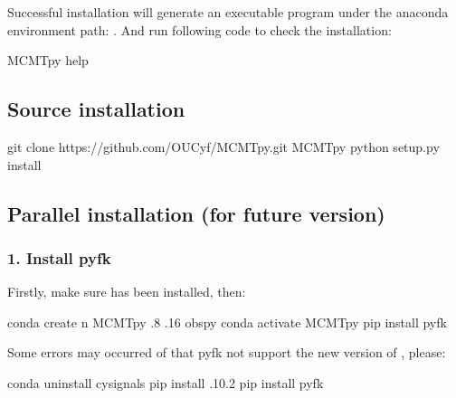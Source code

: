 \documentclass[a4paper,10pt,english,openany]{sphinxmanual}
\begin{document}
Successful installation will generate an executable program  under the anaconda environment path:
. And run following code to check the installation:

\begin{sphinxVerbatim}[commandchars=\\\{\}]
\PYGZdl{} MCMTpy \PYGZhy{}\PYGZhy{}help
\end{sphinxVerbatim}


\subsection{Source installation}
\label{\detokenize{installation:source-installation}}
\begin{sphinxVerbatim}[commandchars=\\\{\}]
\PYGZdl{} git clone https://github.com/OUCyf/MCMTpy.git
\PYGZdl{}  MCMTpy
\PYGZdl{} python setup.py install
\end{sphinxVerbatim}


\subsection{Parallel installation (for future version)}
\label{\detokenize{installation:parallel-installation-for-future-version}}

\subsubsection{1. Install pyfk}
\label{\detokenize{installation:install-pyfk}}
Firstly, make sure  has been installed, then:

\begin{sphinxVerbatim}[commandchars=\\\{\}]
\PYGZdl{} conda create \PYGZhy{}n MCMTpy  .8 .16 obspy
\PYGZdl{} conda activate MCMTpy
\PYGZdl{} pip install pyfk
\end{sphinxVerbatim}

Some errors may occurred of that pyfk not support the new version of , please:

\begin{sphinxVerbatim}[commandchars=\\\{\}]
\PYGZdl{} conda uninstall cysignals
\PYGZdl{} pip install .10.2
\PYGZdl{} pip install pyfk
\end{sphinxVerbatim}
\end{document}
